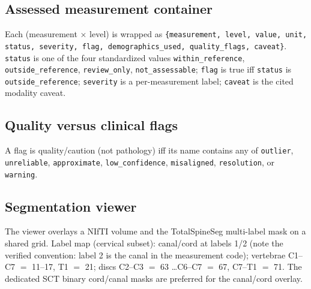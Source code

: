 \subsection{Assessed measurement container}
Each (measurement $\times$ level) is wrapped as
\texttt{\{measurement, level, value, unit, status, severity, flag, demographics\_used, quality\_flags,
caveat\}}. \texttt{status} is one of the four standardized values \texttt{within\_reference},
\texttt{outside\_reference}, \texttt{review\_only}, \texttt{not\_assessable}; \texttt{flag} is true iff
\texttt{status} is \texttt{outside\_reference}; \texttt{severity} is a per-measurement label;
\texttt{caveat} is the cited modality caveat.

\subsection{Quality versus clinical flags}
A flag is quality/caution (not pathology) iff its name contains any of \texttt{outlier},
\texttt{unreliable}, \texttt{approximate}, \texttt{low\_confidence}, \texttt{misaligned},
\texttt{resolution}, or \texttt{warning}.

\subsection{Segmentation viewer}
The viewer overlays a NIfTI volume and the TotalSpineSeg multi-label mask on a shared grid. Label map
(cervical subset): canal/cord at labels 1/2 (note the verified convention: label 2 is the canal in the
measurement code); vertebrae C1--C7 $=$ 11--17, T1 $=$ 21; discs C2--C3 $=$ 63 \ldots C6--C7 $=$ 67,
C7--T1 $=$ 71. The dedicated SCT binary cord/canal masks are preferred for the canal/cord overlay.
